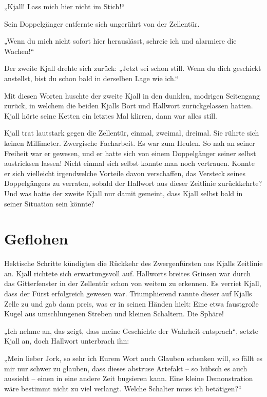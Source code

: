 \documentclass[10pt, a4paper, oneside]{book}
\begin{document}
„Kjall! Lass mich hier nicht im Stich!“

Sein Doppelgänger entfernte sich ungerührt von der Zellentür.

„Wenn du mich nicht sofort hier herauslässt, schreie ich und alarmiere die Wachen!“

Der zweite Kjall drehte sich zurück: „Jetzt sei schon still. Wenn du dich geschickt anstellst, bist du schon bald in derselben Lage wie ich.“

Mit diesen Worten huschte der zweite Kjall in den dunklen, modrigen Seitengang zurück, in welchem die beiden Kjalls Bort und Hallwort zurückgelassen hatten. Kjall hörte seine Ketten ein letztes Mal klirren, dann war alles still.

Kjall trat lautstark gegen die Zellentür, einmal, zweimal, dreimal. Sie rührte sich keinen Millimeter. Zwergische Facharbeit. Es war zum Heulen. So nah an seiner Freiheit war er gewesen, und er hatte sich von einem Doppelgänger seiner selbst austricksen lassen! Nicht einmal sich selbst konnte man noch vertrauen. Konnte er sich vielleicht irgendwelche Vorteile davon verschaffen, das Versteck seines Doppelgängers zu verraten, sobald der Hallwort aus dieser Zeitlinie zurückkehrte? Und was hatte der zweite Kjall nur damit gemeint, dass Kjall selbst bald in seiner Situation sein könnte?


\newpage
\section{Geflohen}



Hektische Schritte kündigten die Rückkehr des Zwergenfürsten aus Kjalls Zeitlinie an. Kjall richtete sich erwartungsvoll auf. Hallworts breites Grinsen war durch das Gitterfenster in der Zellentür schon von weitem zu erkennen. Es verriet Kjall, dass der Fürst erfolgreich gewesen war. Triumphierend rannte dieser auf Kjalls Zelle zu und gab dann preis, was er in seinen Händen hielt: Eine etwa faustgroße Kugel aus umschlungenen Streben und kleinen Schaltern. Die Sphäre!

„Ich nehme an, das zeigt, dass meine Geschichte der Wahrheit entsprach“, setzte Kjall an, doch Hallwort unterbrach ihn:

„Mein lieber Jork, so sehr ich Eurem Wort auch Glauben schenken will, so fällt es mir nur schwer zu glauben, dass dieses abstruse Artefakt – so hübsch es auch aussieht – einen in eine andere Zeit bugsieren kann. Eine kleine Demonstration wäre bestimmt nicht zu viel verlangt. Welche Schalter muss ich betätigen?“
\end{document}
